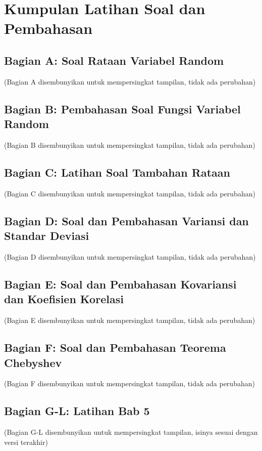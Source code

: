 \documentclass[12pt, a4paper]{article}
\begin{document}
\newpage
\section{Kumpulan Latihan Soal dan Pembahasan}

\subsection{Bagian A: Soal Rataan Variabel Random}
(Bagian A disembunyikan untuk mempersingkat tampilan, tidak ada perubahan)

\subsection{Bagian B: Pembahasan Soal Fungsi Variabel Random}
(Bagian B disembunyikan untuk mempersingkat tampilan, tidak ada perubahan)

\subsection{Bagian C: Latihan Soal Tambahan Rataan}
(Bagian C disembunyikan untuk mempersingkat tampilan, tidak ada perubahan)

\subsection{Bagian D: Soal dan Pembahasan Variansi dan Standar Deviasi}
(Bagian D disembunyikan untuk mempersingkat tampilan, tidak ada perubahan)

\subsection{Bagian E: Soal dan Pembahasan Kovariansi dan Koefisien Korelasi}
(Bagian E disembunyikan untuk mempersingkat tampilan, tidak ada perubahan)

\subsection{Bagian F: Soal dan Pembahasan Teorema Chebyshev}
(Bagian F disembunyikan untuk mempersingkat tampilan, tidak ada perubahan)

\subsection{Bagian G-L: Latihan Bab 5}
(Bagian G-L disembunyikan untuk mempersingkat tampilan, isinya sesuai dengan versi terakhir)
\end{document}
